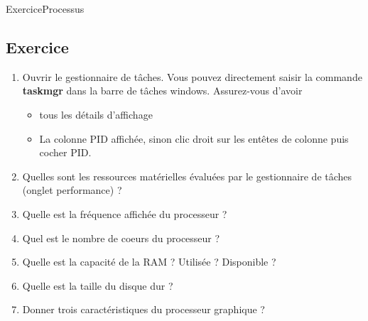 \documentclass[11pt,a4paper]{article}
\newcounter{numexo}
\begin{document}
\begin{NSI}
{Exercice}{Processus}
\end{NSI}






\addtocounter{numexo}{1}
\subsection*{\Large Exercice \thenumexo}
\begin{enumerate}
\item Ouvrir le gestionnaire de tâches. Vous pouvez directement saisir la commande \textbf{taskmgr} dans la barre de tâches windows. Assurez-vous d'avoir 
\begin{itemize}
\item tous les détails d'affichage
\item La colonne PID affichée, sinon clic droit sur les entêtes de colonne puis cocher PID.
\end{itemize}


\item Quelles sont les ressources matérielles évaluées par le gestionnaire de tâches (onglet performance) ?
\item Quelle est la fréquence affichée du processeur ?
\item Quel est le nombre de coeurs du processeur ?
\item Quelle est la capacité de la RAM ? Utilisée ? Disponible ?
\item Quelle est la taille du disque dur ?
\item Donner trois caractéristiques du processeur graphique ?
\end{enumerate}


\addtocounter{numexo}{1}
\end{document}
